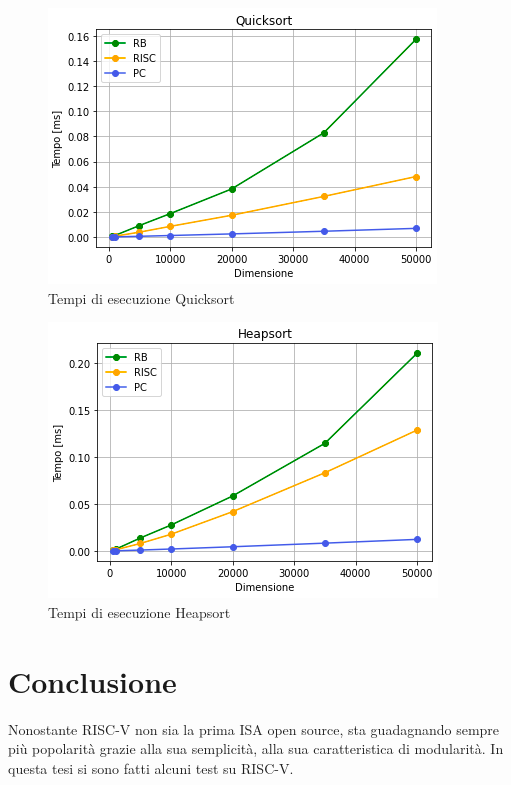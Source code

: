 \documentclass[12pt, a4paper]{report}
\begin{document}
\begin{figure}[ht]
\centering
 \includegraphics[scale=0.8]{Img/GraficiSorting/Quicksort_All.PNG}
 \caption{Tempi di esecuzione Quicksort}
\end{figure}

\begin{figure}[ht]
\centering
 \includegraphics[scale=0.8]{Img/GraficiSorting/Heapsort_All}
 \caption{Tempi di esecuzione Heapsort}
\end{figure}



\chapter{Conclusione}

Nonostante RISC-V non sia la prima ISA open source, sta guadagnando sempre più popolarità grazie alla sua semplicità, alla sua caratteristica di modularità. In questa tesi si sono fatti alcuni test su RISC-V. 
\end{document}
